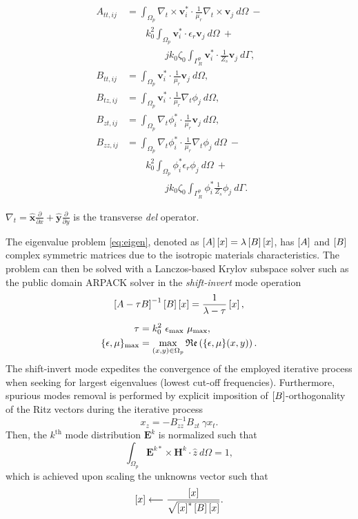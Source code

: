 \begin{equation*}
\begin{aligned}
A_{tt,ij} &= \int_{\Omega_p} \nabla_t \times \mathbf{v}_i^*  \cdot \frac{1}{\mu_r} \nabla_t \times \mathbf{v}_j \ d\Omega \ - \\
 & \qquad k_0^2 \int_{\Omega_p} \mathbf{v}_i^*  \cdot \epsilon_r \mathbf{v}_j \ d\Omega \ + \\ 
&  \qquad \qquad j k_0 \zeta_0
\int_{\Gamma_R^p} \mathbf{v}_i^*  \cdot \frac{1}{Z_s} \mathbf{v}_j \ d\Gamma, \\
B_{tt,ij} &= \int_{\Omega_p} \mathbf{v}_i^*  \cdot  \frac{1}{\mu_r}\mathbf{v}_j \ d\Omega, \\
B_{tz,ij} &= \int_{\Omega_p} \mathbf{v}_i^*  \cdot  \frac{1}{\mu_r}\nabla_t \phi_j \ d\Omega, \\
B_{zt,ij} &= \int_{\Omega_p} \nabla_t \phi_i^*  \cdot  \frac{1}{\mu_r}\mathbf{v}_j \ d\Omega, \\
B_{zz,ij} &= \int_{\Omega_p} \nabla_t \phi_i^*  \cdot  \frac{1}{\mu_r}\nabla_t \phi_j \ d\Omega \ - \\
& \qquad k_0^2 \int_{\Omega_p} \phi_i^* \epsilon_r \phi_j \ d\Omega \ +\\
& \qquad \qquad j k_0 \zeta_0 \int_{\Gamma_R^p} \phi_i^* \frac{1}{Z_s} \phi_j \ d\Gamma.
\end{aligned}
\end{equation*}

\noindent $\nabla_t = \hat{\mathbf{x}} \frac{\partial}{\partial x} + \hat{\mathbf{y}} \frac{\partial}{\partial y}$ is the transverse \textit{del} operator.
%

The eigenvalue problem \eqref{eq:eigen}, denoted as $\left[A\right]\left[{{x}}\right] = \lambda \left[B\right]\left[{{x}}\right]$, has $\left[A\right]$ and $\left[B\right]$ complex symmetric matrices due to the isotropic materials characteristics. The problem can then be solved with a Lanczos-based Krylov subspace solver \cite{farle2004finite} such as the public domain ARPACK solver	\cite{lehoucq1998arpack} in the \textit{shift-invert} mode operation
%
\begin{gather}
\left[ A-\tau B \right]^{-1} \left[B\right] \left[{{x}}\right] =  \frac{1}{\lambda-\tau} \left[{{x}}\right], \nonumber \\[5pt]
\begin{aligned}
\tau &= k_0^2 \ \epsilon_\text{max} \ \mu_\text{max}, \\
\{\epsilon,\mu\}_\text{max} &= \max\limits_{(x,y)\in\Omega_p} \mathfrak{Re}\left( \{\epsilon,\mu\}(x,y) \right).
\end{aligned} \nonumber
\end{gather}
%
\noindent The shift-invert mode expedites the convergence of the employed iterative process when seeking for largest eigenvalues (lowest cut-off frequencies). Furthermore, spurious modes removal is performed by explicit imposition of $\left[B\right]$-orthogonality of the Ritz vectors during the iterative process
%
$$
x_{z}  = - B_{zz}^{-1} B_{zt} \ \gamma x_{t}.
$$
%
Then, the $k^\mathrm{th}$ mode distribution $\mathbf{E}^k$ is normalized such that
%
$$
\int_{\Omega_p}  \mathbf{E}^{k*}  \times  \mathbf{H}^k  \cdot \hat{z} \ d\Omega = 1,
$$
%
\noindent which is achieved upon scaling the unknowns vector such that 
$$ \left[{{x}}\right] \longleftarrow \frac{\left[{{x}}\right]}{\sqrt{ \left[{{x}}\right]^* \left[B\right] \left[{{x}}\right]} }.$$

